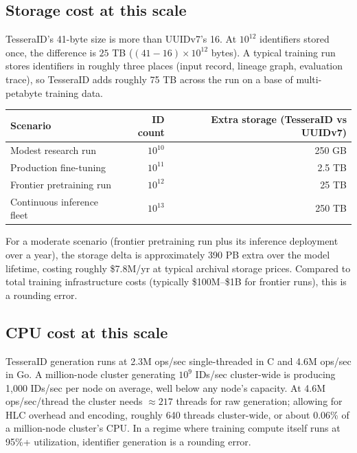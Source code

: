 \subsection{Storage cost at this scale}

TesseraID's 41-byte size is more than UUIDv7's 16. At $10^{12}$ identifiers stored once, the difference is $25$ TB ($(41-16) \times 10^{12}$ bytes). A typical training run stores identifiers in roughly three places (input record, lineage graph, evaluation trace), so TesseraID adds roughly 75 TB across the run on a base of multi-petabyte training data.

\begin{center}
\renewcommand{\arraystretch}{1.15}
\begin{tabular}{lrr}
\toprule
\textbf{Scenario} & \textbf{ID count} & \textbf{Extra storage (TesseraID vs UUIDv7)} \\
\midrule
Modest research run         & $10^{10}$ & 250 GB \\
Production fine-tuning      & $10^{11}$ & 2.5 TB  \\
Frontier pretraining run    & $10^{12}$ & 25 TB   \\
Continuous inference fleet  & $10^{13}$ & 250 TB  \\
\bottomrule
\end{tabular}
\end{center}

For a moderate scenario (frontier pretraining run plus its inference deployment over a year), the storage delta is approximately 390 PB extra over the model lifetime, costing roughly \$7.8M/yr at typical archival storage prices. Compared to total training infrastructure costs (typically \$100M--\$1B for frontier runs), this is a rounding error.

\subsection{CPU cost at this scale}

TesseraID generation runs at 2.3M ops/sec single-threaded in C and 4.6M ops/sec in Go. A million-node cluster generating $10^9$ IDs/sec cluster-wide is producing 1{,}000 IDs/sec per node on average, well below any node's capacity. At 4.6M ops/sec/thread the cluster needs $\approx 217$ threads for raw generation; allowing for HLC overhead and encoding, roughly 640 threads cluster-wide, or about 0.06\% of a million-node cluster's CPU. In a regime where training compute itself runs at 95\%+ utilization, identifier generation is a rounding error.

